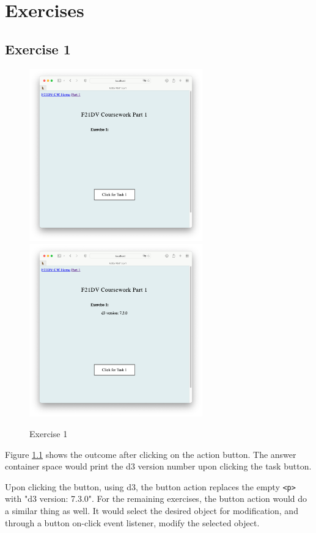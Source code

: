 \documentclass{scrreprt}
\begin{document}
\newpage
\chapter{Exercises}
\section{Exercise 1}
\begin{figure}[!ht]
    \centering
    \includegraphics[width = 7.5cm]{images/ex1_1.png}
    \includegraphics[width = 7.5cm]{images/ex1_2.png}
    \label{fig:ex1}
    \caption{Exercise 1}
\end{figure}
\FloatBarrier
Figure \ref{fig:ex1} shows the outcome after clicking on the action button. The answer container
space would print the d3 version number upon clicking the task button.

Upon clicking the button, using d3, the button action replaces the empty \verb|<p>| with "d3
version: 7.3.0". For the remaining exercises, the button action would do a similar thing as well.
It would select the desired object for modification, and through a button on-click event listener,
modify the selected object.
\end{document}
